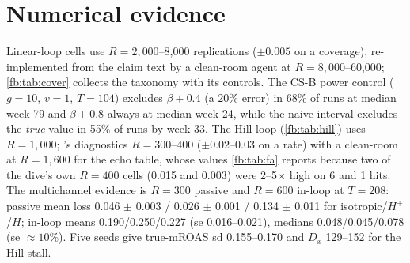 \section{Numerical evidence}
\label{fb:sec:numerics}

Linear-loop cells use $R = 2{,}000$--8,000 replications ($\pm 0.005$ on a coverage), re-implemented from the claim text by a clean-room agent at $R = 8{,}000$--60,000; \cref{fb:tab:cover} collects the taxonomy with its controls. The CS-B power control ($g = 10$, $v = 1$, $T = 104$) excludes $\beta + 0.4$ (a 20\% error) in 68\% of runs at median week 79 and $\beta + 0.8$ always at median week 24, while the naive interval excludes the \emph{true} value in 55\% of runs by week 33. The Hill loop (\cref{fb:tab:hill}) uses $R = 1{,}000$; 's diagnostics $R = 300$--400 ($\pm 0.02$--0.03 on a rate) with a clean-room at $R = 1{,}600$ for the echo table, whose values \cref{fb:tab:fa} reports because two of the dive's own $R = 400$ cells (0.015 and 0.003) were 2--5$\times$ high on 6 and 1 hits. The multichannel evidence is $R = 300$ passive and $R = 600$ in-loop at $T = 208$: passive mean loss 0.046 $\pm$ 0.003 / 0.026 $\pm$ 0.001 / 0.134 $\pm$ 0.011 for isotropic/$H^+$/$H$; in-loop means 0.190/0.250/0.227 (se 0.016--0.021), medians 0.048/0.045/0.078 (se $\approx 10\%$). Five seeds give true-mROAS sd 0.155--0.170 and $D_x$ 129--152 for the Hill stall.

